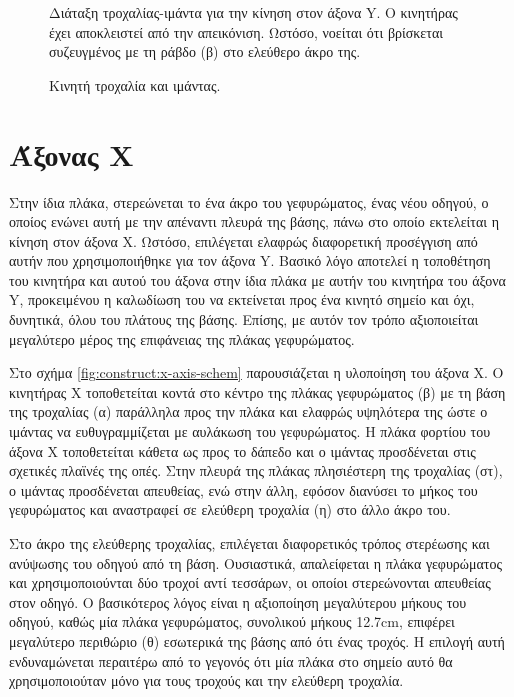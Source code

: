 \begin{figure}
    \caption{Κινητή τροχαλία και ιμάντας. \label{fig:construct:belt-pulley-y}}
Διάταξη τροχαλίας-ιμάντα για την κίνηση στον άξονα Y. Ο κινητήρας έχει
αποκλειστεί από την απεικόνιση. Ωστόσο, νοείται ότι βρίσκεται συζευγμένος με τη
ράβδο (β) στο ελεύθερο άκρο της.
    \begin{center}%
    \def\svgwidth{0.7\textwidth}
    
    \end{center}
\end{figure}


\section{Άξονας X}

Στην ίδια πλάκα, στερεώνεται το ένα άκρο του γεφυρώματος, ένας νέου οδηγού, ο
οποίος ενώνει αυτή με την απέναντι πλευρά της βάσης, πάνω στο οποίο εκτελείται η
κίνηση στον άξονα X.
Ωστόσο, επιλέγεται ελαφρώς διαφορετική προσέγγιση από αυτήν που χρησιμοποιήθηκε
για τον άξονα Y. Βασικό λόγο αποτελεί η τοποθέτηση του κινητήρα και αυτού του
άξονα στην ίδια πλάκα με αυτήν του κινητήρα του άξονα Y, προκειμένου η καλωδίωση
του να εκτείνεται προς ένα κινητό σημείο και όχι, δυνητικά, όλου του πλάτους της
βάσης. Επίσης, με αυτόν τον τρόπο αξιοποιείται μεγαλύτερο μέρος της επιφάνειας
της πλάκας γεφυρώματος.

Στο σχήμα \ref{fig:construct:x-axis-schem} παρουσιάζεται η υλοποίηση του άξονα
X.
Ο κινητήρας X τοποθετείται κοντά στο κέντρο της πλάκας γεφυρώματος (β) με τη
βάση της τροχαλίας (α) παράλληλα προς την πλάκα και ελαφρώς υψηλότερα της ώστε ο
ιμάντας να ευθυγραμμίζεται με αυλάκωση του γεφυρώματος. Η πλάκα φορτίου του
άξονα X τοποθετείται κάθετα ως προς το δάπεδο και ο ιμάντας προσδένεται στις
σχετικές πλαϊνές της οπές. Στην πλευρά της πλάκας πλησιέστερη της τροχαλίας
(στ), ο ιμάντας προσδένεται απευθείας, ενώ στην άλλη, εφόσον διανύσει το μήκος
του γεφυρώματος και αναστραφεί σε ελεύθερη τροχαλία (η) στο άλλο άκρο του.

Στο άκρο της ελεύθερης τροχαλίας, επιλέγεται διαφορετικός τρόπος στερέωσης και
ανύψωσης του οδηγού από τη βάση. Ουσιαστικά, απαλείφεται η πλάκα γεφυρώματος και
χρησιμοποιούνται δύο τροχοί αντί τεσσάρων, οι οποίοι στερεώνονται απευθείας στον
οδηγό. Ο βασικότερος λόγος είναι η αξιοποίηση μεγαλύτερου μήκους του οδηγού,
καθώς μία πλάκα γεφυρώματος, συνολικού μήκους 12.7cm, επιφέρει μεγαλύτερο
περιθώριο (θ) εσωτερικά της βάσης από ότι ένας τροχός. Η επιλογή αυτή
ενδυναμώνεται περαιτέρω από το γεγονός ότι μία πλάκα στο σημείο αυτό θα
χρησιμοποιούταν μόνο για τους τροχούς και την ελεύθερη τροχαλία.


